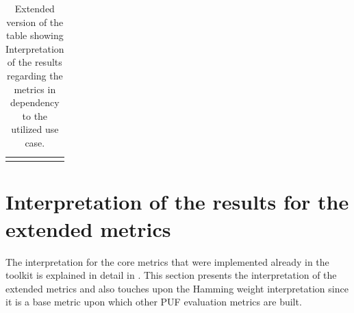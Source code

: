 \begin{table}[!t]
\begin{tabular}{@{}lccccc@{}}
\addlinespace
\bottomrule
\end{tabular}
\caption{Extended version of the table showing Interpretation of the results regarding the metrics in dependency to the utilized use case.}
\label{tab:metrics}
\end{table}

\section{Interpretation of the results for the extended metrics}
The interpretation for the core metrics that were implemented already in the toolkit is explained in detail in \cite{71}. This section presents the interpretation of the extended metrics and also touches upon the Hamming weight interpretation since it is a base metric upon which other PUF evaluation metrics are built.
